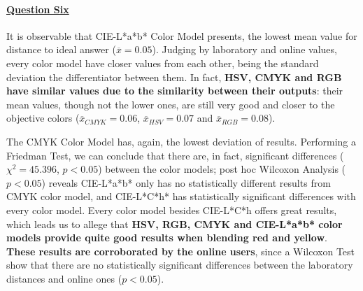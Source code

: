 \paragraph{\ul{Question Six}}
%
It is observable that CIE-L*a*b* Color Model presents, the lowest mean value for distance to ideal answer ($\overline{x} = 0.05$).
Judging by laboratory and online values, every color model have closer values from each other, being the standard deviation the differentiator between them. In fact, \textbf{HSV, CMYK and RGB have similar values due to the similarity between their outputs}: their mean values, though not
the lower ones, are still very good and closer to the objective colors ($\overline{x}_{CMYK} = 0.06$, $\overline{x}_{HSV} = 0.07$ and $\overline{x}_{RGB} = 0.08$). \par
%
The CMYK Color Model has, again, the lowest deviation of results. Performing a Friedman Test, we can conclude that there are, in fact, significant differences ($\chi^2 = 45.396$, $p < 0.05$)
between the color models; post hoc Wilcoxon Analysis ($p < 0.05$) reveals CIE-L*a*b* only has no statistically different results from CMYK color model, and CIE-L*C*h* has statistically
significant differences with every color model. Every color model besides CIE-L*C*h offers great results, which leads us to allege that \textbf{HSV, RGB, CMYK and CIE-L*a*b* color models
provide quite good results when blending red and yellow}. \textbf{These results are corroborated by the online users}, since a Wilcoxon Test show that there are no statistically significant
differences between the laboratory distances and online ones ($p < 0.05$).
%
